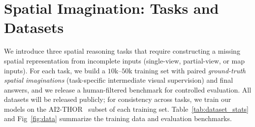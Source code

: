 \documentclass{llmxive}
\begin{document}
\section{Spatial Imagination: Tasks and Datasets}
\label{sec:data}



We introduce three spatial reasoning tasks that require constructing a missing spatial representation from incomplete inputs (single-view, partial-view, or map inputs).
For each task, we build a $10$k--$50$k training set with paired \emph{ground-truth spatial imaginations} (task-specific intermediate visual supervision) and final answers, and we release a human-filtered benchmark for controlled evaluation. All datasets will be released publicly; for consistency across tasks, we train our models on the AI2-THOR~\cite{kolve2017ai2} subset of each training set. 
Table~\ref{tab:dataset_stats} and Fig~\ref{fig:data} summarize the training data and evaluation benchmarks.
\end{document}
